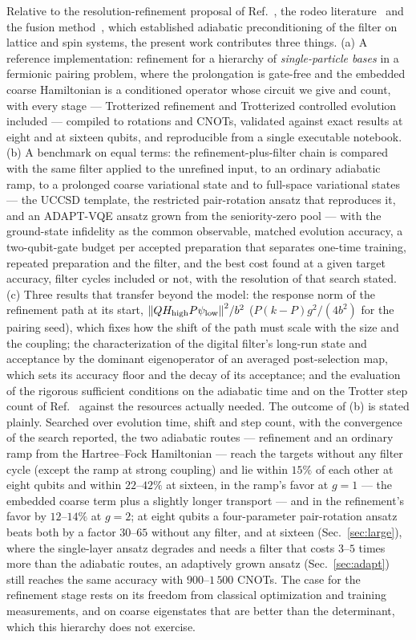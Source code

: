 \documentclass[
  aps,            %
  prc,            %
  reprint,        %
  superscriptaddress,
  floatfix,
  nofootinbib
]{revtex4-2}
\newcommand{\Hhigh}{H_{\mathrm{high}}}
\begin{document}
Relative to the resolution-refinement proposal of Ref.~\cite{Bogner2026}, the
rodeo literature~\cite{Choi2021,Qian2024} and the fusion
method~\cite{Patkowski2025fusion}, which established adiabatic preconditioning
of the filter on lattice and spin systems, the present work contributes
three things.  (a) A reference implementation: refinement for a hierarchy of
\emph{single-particle bases} in a fermionic pairing problem, where the
prolongation is gate-free and the embedded coarse Hamiltonian is a conditioned
operator whose circuit we give and count, with every stage --- Trotterized
refinement and Trotterized controlled evolution included --- compiled to
rotations and CNOTs, validated against exact results at eight and at sixteen
qubits, and reproducible from a single executable notebook.  (b) A benchmark
on equal terms: the refinement-plus-filter chain is compared with the same
filter applied to the unrefined input, to an ordinary adiabatic ramp, to a
prolonged coarse variational state and to full-space variational states ---
the UCCSD template, the restricted pair-rotation ansatz that reproduces it,
and an ADAPT-VQE ansatz grown from the seniority-zero pool --- with the
ground-state infidelity as the common observable, matched
evolution accuracy, a two-qubit-gate budget per accepted preparation that
separates one-time training, repeated preparation and the filter, and the
best cost found at a given target accuracy, filter cycles included or not,
with the resolution of that search stated.
(c) Three results that transfer beyond the model: the response norm of
the refinement path at its start, $\norm{Q\Hhigh P\psi_{\rm low}}^2/b^2$
($P(k-P)g^2/(4b^2)$ for the pairing seed), which fixes how the shift of
the path must scale with the size and the coupling; the characterization
of the digital filter's long-run state and acceptance by the dominant
eigenoperator of an averaged post-selection map, which sets its accuracy
floor and the decay of its acceptance; and the
evaluation of the rigorous sufficient conditions on the adiabatic time and
on the Trotter step count of Ref.~\cite{Sadia2026} against the resources
actually needed.  The outcome of (b) is stated plainly.  Searched over
evolution time, shift and step count, with the convergence of the search
reported, the two adiabatic routes ---
refinement and an ordinary ramp from the Hartree--Fock Hamiltonian ---
reach the targets without any filter cycle (except the ramp at strong
coupling) and lie within $15\%$ of each other at eight qubits and within
$22$--$42\%$ at sixteen, in the ramp's favor at $g=1$ --- the embedded
coarse term plus a slightly longer transport --- and in the refinement's
favor by $12$--$14\%$ at $g=2$; at eight qubits a four-parameter
pair-rotation ansatz beats both by a factor $30$--$65$ without any filter,
and at sixteen (Sec.~\ref{sec:large}), where the single-layer ansatz
degrades and needs a filter that costs $3$--$5$ times more than the
adiabatic routes, an adaptively grown ansatz (Sec.~\ref{sec:adapt}) still
reaches the same accuracy with $900$--$1\,500$ CNOTs.  The case for the
refinement stage rests on its freedom from classical optimization and
training measurements, and on coarse eigenstates that are better than the
determinant, which this hierarchy does not exercise.
\end{document}
